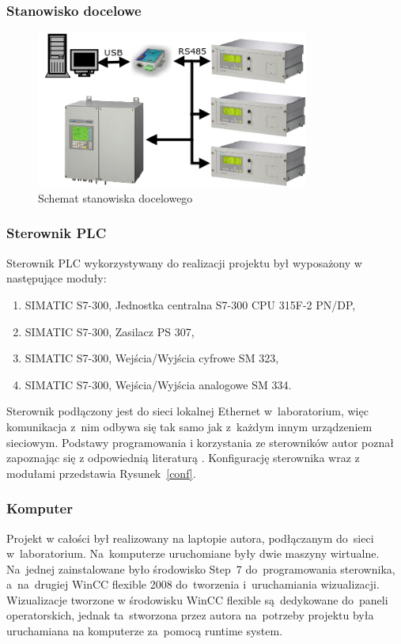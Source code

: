 \subsubsection{Stanowisko docelowe}
\begin{figure}[!htb] 	\centering 	\includegraphics[width=0.8\textwidth]{images/schemat2} 	\caption{Schemat stanowiska docelowego} \label{schemat2} \end{figure} 

\subsubsection{Sterownik PLC}
Sterownik PLC wykorzystywany do realizacji projektu był wyposażony w następujące moduły:
\begin{enumerate}
\item SIMATIC S7-300, Jednostka centralna S7-300 CPU 315F-2 PN/DP,
\item SIMATIC S7-300, Zasilacz PS 307,
\item SIMATIC S7-300, Wejścia/Wyjścia cyfrowe SM 323,
\item SIMATIC S7-300, Wejścia/Wyjścia analogowe SM 334.
\end{enumerate}

\indent
\indent Sterownik podłączony jest do sieci lokalnej Ethernet w~laboratorium, więc komunikacja z~nim odbywa się tak samo jak z~każdym innym urządzeniem sieciowym. Podstawy programowania i korzystania ze sterowników autor poznał zapoznając się z odpowiednią literaturą \cite{plc1,plc2,plc4,plc5,plc6}.
Konfigurację sterownika wraz z modułami przedstawia Rysunek~\ref{conf}.

\subsubsection{Komputer}
Projekt w całości był realizowany na laptopie autora, podłączanym do~sieci w~laboratorium. Na~komputerze uruchomiane były dwie maszyny wirtualne. Na~jednej zainstalowane było środowisko Step~7 do~programowania sterownika, a~na~drugiej WinCC flexible 2008 do~tworzenia i~uruchamiania wizualizacji. Wizualizacje tworzone w środowisku WinCC flexible są~dedykowane do~paneli operatorskich, jednak ta~stworzona przez autora na~potrzeby projektu była uruchamiana na komputerze za~pomocą runtime system.

